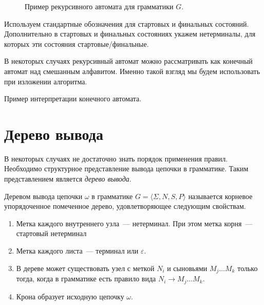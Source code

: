 \begin{figure}
    \caption{Пример рекурсивного автомата для грамматики $G$.}
    \label{input1}
\end{figure}


Используем стандартные обозначения для стартовых и финальных состояний.
Дополнительно в стартовых и финальных состояниях укажем нетерминалы, для которых эти состояния стартовые/финальные.

В некоторых случаях рекурсивный автомат можно рассматривать как конечный автомат над смешанным алфавитом.
Именно такой взгляд мы будем использовать при изложении алгоритма.

Пример интерпретации конечного автомата.


\section{Дерево вывода}
\label{sect:DerivTree}

В некоторых случаях не достаточно знать порядок применения правил.
Необходимо структурное представление вывода цепочки в грамматике.
Таким представлением является \emph{дерево вывода}.

\begin{definition}
    Деревом вывода цепочки $\omega$ в грамматике $G = \langle \Sigma, N, S, P \rangle$ называется корневое упорядоченное помеченное дерево, удовлетворяющее следующим свойствам.
    \begin{enumerate}
        \item Метка каждого внутреннего узла~--- нетерминал. При этом метка корня~--- стартовый нетерминал
        \item Метка каждого листа~--- терминал или $\varepsilon$.
        \item В дереве может существовать узел с меткой $N_i$ и сыновьями $M_j \dots M_k$ только тогда, когда в грамматике есть правило вида $N_i \to M_j \dots M_k$.
        \item Крона образует исходную цепочку $\omega$.
    \end{enumerate}
\end{definition}

